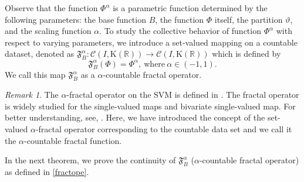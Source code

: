 \documentclass[12pt,oneside,reqno]{amsart}
\theoremstyle{definition}
\theoremstyle{remark}
\newtheorem{remark}[theorem]{Remark}
\begin{document}
Observe that the function $\Phi^{\alpha}$ is a parametric function determined by the following parameters: the base function $B$, the function $\Phi$ itself, the partition $\vartheta$, and the scaling function $\alpha$. To study the collective behavior of function $\Phi^{\alpha}$ with respect to varying parameters, we introduce a set-valued mapping on a countable dataset, denoted as $\mathfrak{F}^{\alpha}_{B}: \mathcal{C}(I, \mathrm{K}(\mathbb{R})) \rightarrow \mathcal{C}(I, \mathrm{K}(\mathbb{R}))$ which is defined by 
\begin{equation}\label{fractope}
    \mathfrak{F}^{\alpha}_{B}(\Phi)=\Phi^{\alpha},~ \text{where}~ \alpha \in (-1,1).
\end{equation}
We call this map $\mathfrak{F}^{\alpha}_{B} $ as a $\alpha$-countable  fractal operator.

\begin{remark}
The $\alpha$-fractal operator on the SVM is defined in \cite{Ver21}. The fractal operator is widely studied for the single-valued maps and bivariate single-valued map. For better understanding, see, \cite{Navascues2005,Navascues2010,sverma3}. Here, we have introduced the concept of the set-valued $\alpha$-fractal operator corresponding to the countable data set and we call it the $\alpha$-countable fractal function. 
   
\end{remark}
In the next theorem, we prove the continuity of $\mathfrak{F}^{\alpha}_B$ ($\alpha$-countable fractal operator) as defined in \eqref{fractope}.
\end{document}
